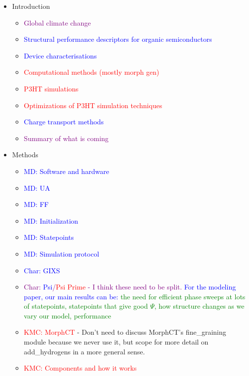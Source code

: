 \documentclass[12pt]{article}
\begin{document}
\begin{itemize}
    \item{Introduction
        \begin{itemize}
            \item{\textcolor{purple}{Global climate change}}
            \item{\textcolor{blue}{Structural performance descriptors for organic semiconductors}}
            \item{\textcolor{blue}{Device characterisations}}
            \item{\textcolor{red}{Computational methods (mostly morph gen)}}
            \item{\textcolor{red}{P3HT simulations}}
            \item{\textcolor{red}{Optimizations of P3HT simulation techniques}}
            \item{\textcolor{blue}{Charge transport methods}}
            \item{\textcolor{purple}{Summary of what is coming}}
        \end{itemize}}
    \item{Methods
        \begin{itemize}
            \item{\textcolor{blue}{MD: Software and hardware}}
            \item{\textcolor{blue}{MD: UA}}
            \item{\textcolor{blue}{MD: FF}}
            \item{\textcolor{blue}{MD: Initialization}}
            \item{\textcolor{blue}{MD: Statepoints}}
            \item{\textcolor{blue}{MD: Simulation protocol}}
            \item{\textcolor{blue}{Char: GIXS}}
            \item{\textcolor{purple}{Char: \textcolor{blue}{Psi}/\textcolor{red}{Psi Prime} - I think these need to be split. \textcolor{blue}{For the modeling paper, our main results can be:} \textcolor{green}{the need for efficient phase sweeps at lots of statepoints, statepoints that give good $\Psi$, how structure changes as we vary our model, performance}}}
            \item{\textcolor{red}{KMC: MorphCT} - Don't need to discuss MorphCT's fine\_graining module because we never use it, but scope for more detail on add\_hydrogens in a more general sense.}
            \item{\textcolor{red}{KMC: Components and how it works}}

\end{itemize}}
\end{itemize}
\end{document}
